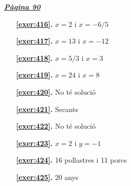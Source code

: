 
\hyperlink{page.90}{\textbf{\em Pàgina 90}}
\begin{enumerate}
\item[\fontfamily{phv}\selectfont\color{blue}\textbf{\ref{exer:416}. }] \label{ans:416} 
$x=2$ i $x=-6/5$
 \end{enumerate}
\begin{enumerate}
\item[\fontfamily{phv}\selectfont\color{blue}\textbf{\ref{exer:417}. }] \label{ans:417} 
$x=13$ i $x=-12$
\item[\fontfamily{phv}\selectfont\color{blue}\textbf{\ref{exer:418}. }] \label{ans:418} 
$x=5/3$ i $x=3$
\item[\fontfamily{phv}\selectfont\color{blue}\textbf{\ref{exer:419}. }] \label{ans:419} 
$x=24$ i $x=8$
\item[\fontfamily{phv}\selectfont\color{blue}\textbf{\ref{exer:420}. }] \label{ans:420} 
No té solució
\item[\fontfamily{phv}\selectfont\color{blue}\textbf{\ref{exer:421}. }] \label{ans:421} 
Secants
\item[\fontfamily{phv}\selectfont\color{blue}\textbf{\ref{exer:422}. }] \label{ans:422} 
No té solució
\item[\fontfamily{phv}\selectfont\color{blue}\textbf{\ref{exer:423}. }] \label{ans:423} 
$x=2$ i $y=-1$
\item[\fontfamily{phv}\selectfont\color{blue}\textbf{\ref{exer:424}. }] \label{ans:424} 
16 pollastres i 11 porcs
\item[\fontfamily{phv}\selectfont\color{blue}\textbf{\ref{exer:425}. }] \label{ans:425} 
20 anys
 \end{enumerate}

 \vspace{1cm} 
 

\vspace{0.3cm}


